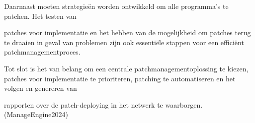 Daarnaast moeten strategieën worden ontwikkeld om alle programma's te patchen. Het testen van 

patches voor implementatie en het hebben van de mogelijkheid om patches terug te draaien in geval van problemen zijn ook essentiële stappen voor een efficiënt patchmanagementproces. 

Tot slot is het van belang om een centrale patchmanagementoplossing te kiezen, patches voor implementatie te prioriteren, patching te automatiseren en het volgen en genereren van 

rapporten over de patch-deploying in het netwerk te waarborgen. (ManageEngine2024)


